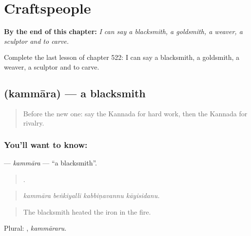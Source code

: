 
\chapter{Craftspeople}
\label{ch:ka-craftspeople}

\begin{chapteropening}
\textbf{By the end of this chapter:} \emph{I can say a blacksmith, a goldsmith, a weaver, a sculptor and to carve.}

Complete the last lesson of chapter 522: I can say a blacksmith, a goldsmith, a weaver, a sculptor and to carve.
\end{chapteropening}

\section[\texorpdfstring{\kn{ಕಮ್ಮಾರ} (kammāra)}{ಕಮ್ಮಾರ (kammāra)}]{ (kammāra) — a blacksmith}

\label{lesson:KA-C522-kammara}



\begin{quote}
Before the new one: say the Kannada for hard work, then the Kannada for rivalry.
\end{quote}

\subsection*{You'll want to know: }
\textbf{} — \emph{kammāra} — \textquotedblleft{}a blacksmith\textquotedblright{}.

\begin{quote}
   .
\end{quote}

\begin{quote}
\emph{kammāra beṅkiyalli kabbiṇavannu kāyisidanu.}
\end{quote}

\begin{quote}
The blacksmith heated the iron in the fire.
\end{quote}

Plural: , \emph{kammāraru}.

